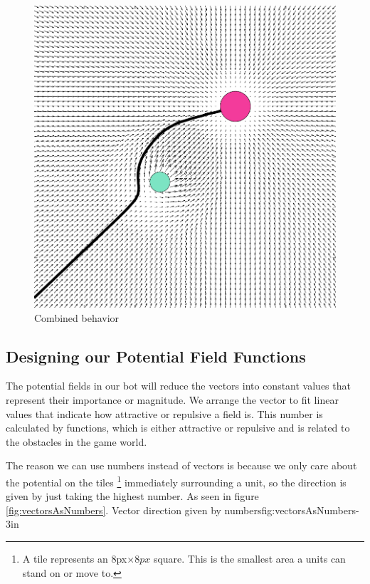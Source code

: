 	\begin{figure}[H]
		\begin{center}
			\includegraphics[scale=0.3]{Figures/Potentialfields/combined.png}
			\caption{Combined behavior\cite{pft}}\label{fig:combinedbehavior}
			\end{center}
	\end{figure}
		
	
	\subsection{Designing our Potential Field Functions}		
		The potential fields in our bot will reduce the vectors into constant values that represent their importance or magnitude. We arrange the vector to fit linear values that indicate how attractive or repulsive a field is. 
		This number is calculated by functions, which is either attractive or repulsive and is related to the obstacles in the game world. 
		
		The reason we can use numbers instead of vectors is because we only care about the potential on the tiles 
		\footnote{A tile represents an 8px$\times8px$ square. 
		This is the smallest area a units can stand on or move to.} 
		immediately surrounding a unit, so the direction is given by just taking the highest number. As seen in figure \ref{fig:vectorsAsNumbers}.
		{Vector direction given by numbers}{fig:vectorsAsNumbers}{-3in}
		\\
		\pagebreak

